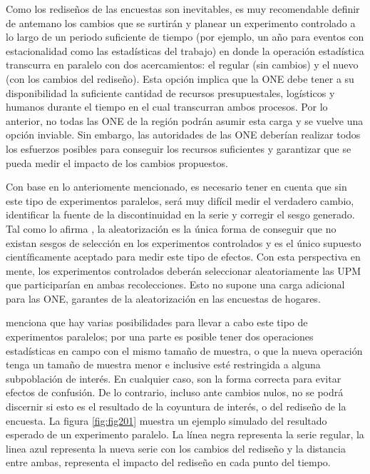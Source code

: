 \documentclass[
  12pt,
]{book}
\begin{document}
Como los rediseños de las encuestas son inevitables, es muy recomendable definir de antemano los cambios que se surtirán y planear un experimento controlado a lo largo de un periodo suficiente de tiempo (por ejemplo, un año para eventos con estacionalidad como las estadísticas del trabajo) en donde la operación estadística transcurra en paralelo con dos acercamientos: el regular (sin cambios) y el nuevo (con los cambios del rediseño). Esta opción implica que la ONE debe tener a su disponibilidad la suficiente cantidad de recursos presupuestales, logísticos y humanos durante el tiempo en el cual transcurran ambos procesos. Por lo anterior, no todas las ONE de la región podrán asumir esta carga y se vuelve una opción inviable. Sin embargo, las autoridades de las ONE deberían realizar todos los esfuerzos posibles para conseguir los recursos suficientes y garantizar que se pueda medir el impacto de los cambios propuestos.

Con base en lo anteriomente mencionado, es necesario tener en cuenta que sin este tipo de experimentos paralelos, será muy difícil medir el verdadero cambio, identificar la fuente de la discontinuidad en la serie y corregir el sesgo generado. Tal como lo afirma \citet{Imbens_Rubin_2015}, la aleatorización es la única forma de conseguir que no existan sesgos de selección en los experimentos controlados y es el único supuesto científicamente aceptado para medir este tipo de efectos. Con esta perspectiva en mente, los experimentos controlados deberán seleccionar aleatoriamente las UPM que participarían en ambas recolecciones. Esto no supone una carga adicional para las ONE, garantes de la aleatorización en las encuestas de hogares.

\citet{Brakel2008} menciona que hay varias posibilidades para llevar a cabo este tipo de experimentos paralelos; por una parte es posible tener dos operaciones estadísticas en campo con el mismo tamaño de muestra, o que la nueva operación tenga un tamaño de muestra menor e inclusive esté restringida a alguna subpoblación de interés. En cualquier caso, son la forma correcta para evitar efectos de confusión. De lo contrario, incluso ante cambios nulos, no se podrá discernir si esto es el resultado de la coyuntura de interés, o del rediseño de la encuesta. La figura \ref{fig:fig201} muestra un ejemplo simulado del resultado esperado de un experimento paralelo. La línea negra representa la serie regular, la linea azul representa la nueva serie con los cambios del rediseño y la distancia entre ambas, representa el impacto del rediseño en cada punto del tiempo.
\end{document}
